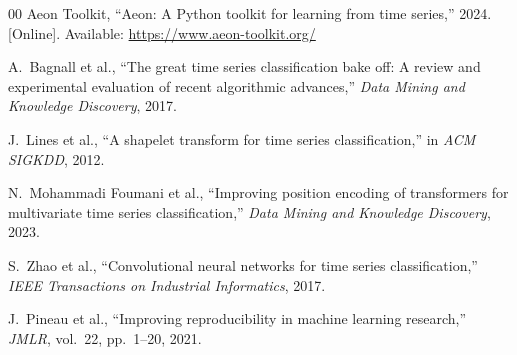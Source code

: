 \documentclass[conference]{IEEEtran}
\begin{document}
\begin{thebibliography}{00}
 Aeon Toolkit, ``Aeon: A Python toolkit for learning from time series,'' 2024. [Online]. Available: \url{https://www.aeon-toolkit.org/}

 A.~Bagnall et al., ``The great time series classification bake off: A review and experimental evaluation of recent algorithmic advances,'' \textit{Data Mining and Knowledge Discovery}, 2017.

 J.~Lines et al., ``A shapelet transform for time series classification,'' in \textit{ACM SIGKDD}, 2012.

 N.~Mohammadi Foumani et al., ``Improving position encoding of transformers for multivariate time series classification,'' \textit{Data Mining and Knowledge Discovery}, 2023.

 S.~Zhao et al., ``Convolutional neural networks for time series classification,'' \textit{IEEE Transactions on Industrial Informatics}, 2017.

 J.~Pineau et al., ``Improving reproducibility in machine learning research,'' \textit{JMLR}, vol.~22, pp.~1--20, 2021.

\end{thebibliography}
\end{document}
